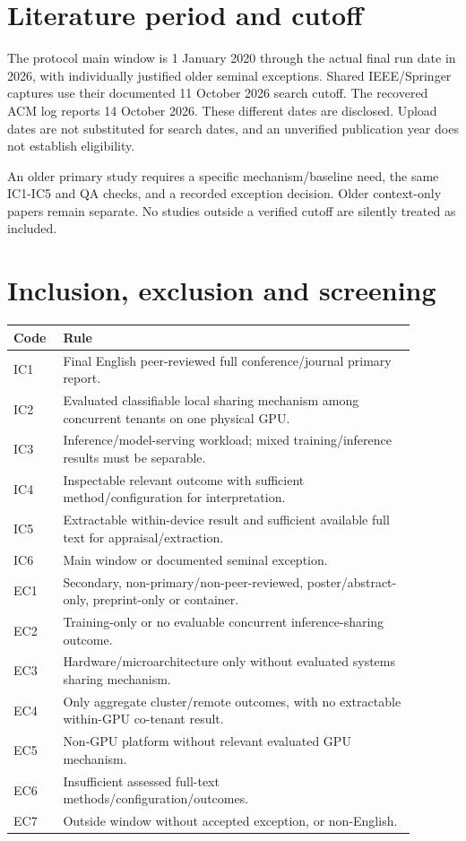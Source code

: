 \documentclass[12pt,a4paper]{article}
\begin{document}
\section{Literature period and cutoff}
The protocol main window is 1 January 2020 through the actual final run date in 2026, with individually justified older seminal exceptions. Shared IEEE/\allowbreak{}Springer captures use their documented 11 October 2026 search cutoff. The recovered ACM log reports 14 October 2026. These different dates are disclosed. Upload dates are not substituted for search dates, and an unverified publication year does not establish eligibility.


An older primary study requires a specific mechanism/\allowbreak{}baseline need, the same IC1-IC5 and QA checks, and a recorded exception decision. Older context-only papers remain separate. No studies outside a verified cutoff are silently treated as included.


\section{Inclusion, exclusion and screening}
\begin{longtable}{p{0.1\linewidth}p{0.79\linewidth}}
\toprule
Code & Rule\\\midrule
\endhead
IC1 & Final English peer-reviewed full conference/\allowbreak{}journal primary report.\\
IC2 & Evaluated classifiable local sharing mechanism among concurrent tenants on one physical GPU.\\
IC3 & Inference/\allowbreak{}model-serving workload; mixed training/\allowbreak{}inference results must be separable.\\
IC4 & Inspectable relevant outcome with sufficient method/\allowbreak{}configuration for interpretation.\\
IC5 & Extractable within-device result and sufficient available full text for appraisal/\allowbreak{}extraction.\\
IC6 & Main window or documented seminal exception.\\
EC1 & Secondary, non-primary/\allowbreak{}non-peer-reviewed, poster/\allowbreak{}abstract-only, preprint-only or container.\\
EC2 & Training-only or no evaluable concurrent inference-sharing outcome.\\
EC3 & Hardware/\allowbreak{}microarchitecture only without evaluated systems sharing mechanism.\\
EC4 & Only aggregate cluster/\allowbreak{}remote outcomes, with no extractable within-GPU co-tenant result.\\
EC5 & Non-GPU platform without relevant evaluated GPU mechanism.\\
EC6 & Insufficient assessed full-text methods/\allowbreak{}configuration/\allowbreak{}outcomes.\\
EC7 & Outside window without accepted exception, or non-English.\\
\bottomrule
\end{longtable}
\end{document}
